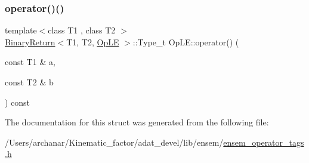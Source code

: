 \mbox{\label{structOpLE_a59addad5005738f86a6d4a5216c9348f}} 
\subsubsection{\texorpdfstring{operator()()}{operator()()}\hspace{0.1cm}{\footnotesize\ttfamily [2/2]}}
{\footnotesize\ttfamily template$<$class T1 , class T2 $>$ \\
\mbox{\hyperlink{structBinaryReturn}{Binary\+Return}}$<$T1, T2, \mbox{\hyperlink{structOpLE}{Op\+LE}} $>$\+::Type\+\_\+t Op\+L\+E\+::operator() (\begin{DoxyParamCaption}\item[{const T1 \&}]{a,  }\item[{const T2 \&}]{b }\end{DoxyParamCaption}) const\hspace{0.3cm}{\ttfamily [inline]}}



The documentation for this struct was generated from the following file\+:\begin{DoxyCompactItemize}
\item 
/\+Users/archanar/\+Kinematic\+\_\+factor/adat\+\_\+devel/lib/ensem/\mbox{\hyperlink{lib_2ensem_2ensem__operator__tags_8h}{ensem\+\_\+operator\+\_\+tags.\+h}}\end{DoxyCompactItemize}

